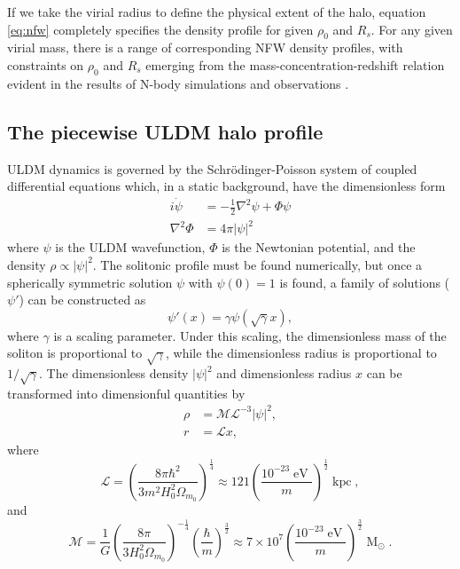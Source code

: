 \documentclass[a4paper,11pt]{article}
\begin{document}
If we take the virial radius to define the  physical extent of the halo, equation \ref{eq:nfw} completely specifies the density profile for given  $\rho_0$ and $R_s$. For any given virial mass, there is a range of corresponding NFW density profiles, with constraints on $\rho_0$ and $R_s$ emerging from the mass-concentration-redshift relation evident in the results of N-body simulations and observations \cite{Ludlow:2013vxa, Ragagnin:2018enf}. 

\subsection{The piecewise ULDM halo profile}

ULDM dynamics is governed by the Schr{\"o}dinger-Poisson system of coupled differential equations which, in a static background, have the dimensionless form  
%
\begin{align}
    i\dot{\psi} &= -\frac{1}{2}\nabla^2\psi+\Phi\psi \\
    \nabla^2\Phi &= 4\pi \vert \psi\vert^2
\end{align}
%
where $\psi$ is the ULDM wavefunction, $\Phi$ is the Newtonian potential, and the density $\rho \propto |\psi|^2$. The solitonic profile must be found numerically, but once a spherically symmetric  solution $\psi$ with $\psi(0)=1$ is found, a family of solutions ($\psi'$) can be constructed as%
\begin{equation}
    \psi'(x) = \gamma\psi(\sqrt{\gamma}x),
\end{equation}
where $\gamma$ is a scaling parameter. Under this scaling, the dimensionless mass of the soliton is proportional to $\sqrt{\gamma}$, while the dimensionless radius is proportional to $1/\sqrt{\gamma}$. The dimensionless density $\vert\psi\vert^2$ and dimensionless radius $x$ can be transformed into dimensionful quantities by
\begin{align}
    \rho &= \mathcal{M}\mathcal{L}^{-3}\vert\psi\vert^2, \label{eq:density_conv} \\
    r &= \mathcal{L}x, \label{eq:mass_conv}
\end{align}
where
\begin{equation}\label{eq:length}
    \mathcal{L}=\left(\frac{8\pi\hbar^2}{3 m^2H_0^2\Omega_{m_0}}\right)^{\frac{1}{4}}\approx121\left(\frac{10^{-23}\operatorname{eV}}{m}\right)^{\frac{1}{2}}\operatorname{kpc},
\end{equation}
%
and 
%
\begin{equation}\label{eq:mass}
    \mathcal{M}=\frac{1}{G}\left(\frac{8\pi}{3 H_0^2\Omega_{m_0}}\right)^{-\frac{1}{4}}\left(\frac{\hbar}{m}\right)^{\frac{3}{2}}\approx 7\times 10^7\left(\frac{10^{-23}\operatorname{eV}}{m}\right)^{\frac{3}{2}}\operatorname{M}_{\odot}.
\end{equation}
\end{document}
